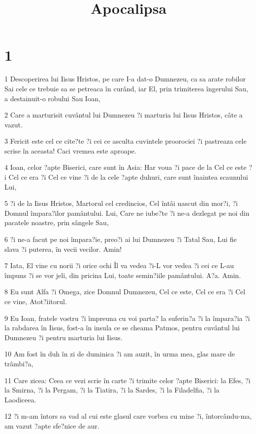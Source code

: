 

\title{Apocalipsa}


\chapter{1}

\par 1 Descoperirea lui Iisus Hristos, pe care I-a dat-o Dumnezeu, ca sa arate robilor Sai cele ce trebuie sa se petreaca în curând, iar El, prin trimiterea îngerului Sau, a destainuit-o robului Sau Ioan,
\par 2 Care a marturisit cuvântul lui Dumnezeu ?i marturia lui Iisus Hristos, câte a vazut.
\par 3 Fericit este cel ce cite?te ?i cei ce asculta cuvintele proorociei ?i pastreaza cele scrise în aceasta! Caci vremea este aproape.
\par 4 Ioan, celor ?apte Biserici, care sunt în Asia: Har voua ?i pace de la Cel ce este ?i Cel ce era ?i Cel ce vine ?i de la cele ?apte duhuri, care sunt înaintea scaunului Lui,
\par 5 ?i de la Iisus Hristos, Martorul cel credincios, Cel întâi nascut din mor?i, ?i Domnul împara?ilor pamântului. Lui, Care ne iube?te ?i ne-a dezlegat pe noi din pacatele noastre, prin sângele Sau,
\par 6 ?i ne-a facut pe noi împara?ie, preo?i ai lui Dumnezeu ?i Tatal Sau, Lui fie slava ?i puterea, în vecii vecilor. Amin!
\par 7 Iata, El vine cu norii ?i orice ochi Îl va vedea ?i-L vor vedea ?i cei ce L-au împuns ?i se vor jeli, din pricina Lui, toate semin?iile pamântului. A?a. Amin.
\par 8 Eu sunt Alfa ?i Omega, zice Domnul Dumnezeu, Cel ce este, Cel ce era ?i Cel ce vine, Atot?iitorul.
\par 9 Eu Ioan, fratele vostru ?i împreuna cu voi parta? la suferin?a ?i la împara?ia ?i la rabdarea în Iisus, fost-a în insula ce se cheama Patmos, pentru cuvântul lui Dumnezeu ?i pentru marturia lui Iisus.
\par 10 Am fost în duh în zi de duminica ?i am auzit, în urma mea, glas mare de trâmbi?a,
\par 11 Care zicea: Ceea ce vezi scrie în carte ?i trimite celor ?apte Biserici: la Efes, ?i la Smirna, ?i la Pergam, ?i la Tiatira, ?i la Sardes, ?i la Filadelfia, ?i la Laodiceea.
\par 12 ?i m-am întors sa vad al cui este glasul care vorbea cu mine ?i, întorcându-ma, am vazut ?apte sfe?nice de aur.
